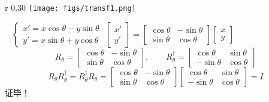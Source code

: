 \begin{frame}     
    \例[15、 试证明二维平面矢量绕原点的旋转变换是幺正变换]{}
    \begin{wrapfigure} {r} {0.30\textwidth} %
        \texttt{[image: figs/transf1.png]}   
    \end{wrapfigure}
    \证~
    $\left\{\begin{matrix}
        x'=x\cos\theta -y\sin\theta\\
        y'=x\sin\theta+y\cos\theta
    \end{matrix}\right.$ \quad
    $\begin{bmatrix}
        x' \\
        y'
    \end{bmatrix}
    =
    \begin{bmatrix}
        \cos\theta & -\sin\theta\\
        \sin\theta & \cos\theta
    \end{bmatrix}
    \begin{bmatrix}
        x \\
        y
    \end{bmatrix}$\\
    $$ R_\theta=
    \begin{bmatrix}
        \cos\theta &-\sin\theta\\
        \sin\theta &\cos\theta
    \end{bmatrix} ,\qquad
    R_\theta ^{\dagger}=
    \begin{bmatrix}
        \cos\theta &\sin\theta\\
        -\sin\theta &\cos\theta
    \end{bmatrix} $$
    $$ R_\theta  R_\theta ^{\dagger} = R_\theta ^{\dagger} R_\theta=  
    \begin{bmatrix}
        \cos\theta &-\sin\theta\\
        \sin\theta &\cos\theta
    \end{bmatrix}
    \begin{bmatrix}
        \cos\theta &\sin\theta\\
        -\sin\theta &\cos\theta
    \end{bmatrix}
    =I
    $$
    证毕！
\end{frame}

